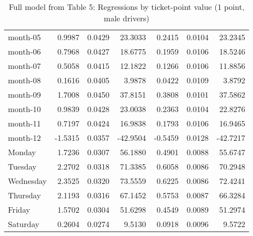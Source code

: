 \documentclass[10pt]{article}
\begin{document}
\begin{table}[ht]
\begin{tabular}{lrrrrrr}
  month-05 & 0.9987 & 0.0429 & 23.3033 & 0.2415 & 0.0104 & 23.2345 \\ 
  month-06 & 0.7968 & 0.0427 & 18.6775 & 0.1959 & 0.0106 & 18.5246 \\ 
  month-07 & 0.5058 & 0.0415 & 12.1822 & 0.1266 & 0.0106 & 11.8856 \\ 
  month-08 & 0.1616 & 0.0405 & 3.9878 & 0.0422 & 0.0109 & 3.8792 \\ 
  month-09 & 1.7008 & 0.0450 & 37.8151 & 0.3808 & 0.0101 & 37.5862 \\ 
  month-10 & 0.9839 & 0.0428 & 23.0038 & 0.2363 & 0.0104 & 22.8276 \\ 
  month-11 & 0.7197 & 0.0424 & 16.9838 & 0.1793 & 0.0106 & 16.9465 \\ 
  month-12 & -1.5315 & 0.0357 & -42.9504 & -0.5459 & 0.0128 & -42.7217 \\ 
  Monday & 1.7236 & 0.0307 & 56.1880 & 0.4901 & 0.0088 & 55.6747 \\ 
  Tuesday & 2.2702 & 0.0318 & 71.3385 & 0.6058 & 0.0086 & 70.2948 \\ 
  Wednesday & 2.3525 & 0.0320 & 73.5559 & 0.6225 & 0.0086 & 72.4241 \\ 
  Thursday & 2.1193 & 0.0316 & 67.1452 & 0.5753 & 0.0087 & 66.3284 \\ 
  Friday & 1.5702 & 0.0304 & 51.6298 & 0.4549 & 0.0089 & 51.2974 \\ 
  Saturday & 0.2604 & 0.0274 & 9.5130 & 0.0918 & 0.0096 & 9.5722 \\ 
   \hline
\end{tabular}
\caption{Full model from Table 5: Regressions by ticket-point value (1 point, male drivers)} 
\label{tab_5_1_pts_no_age_M}
\end{table}


\clearpage
\pagebreak



\end{document}
